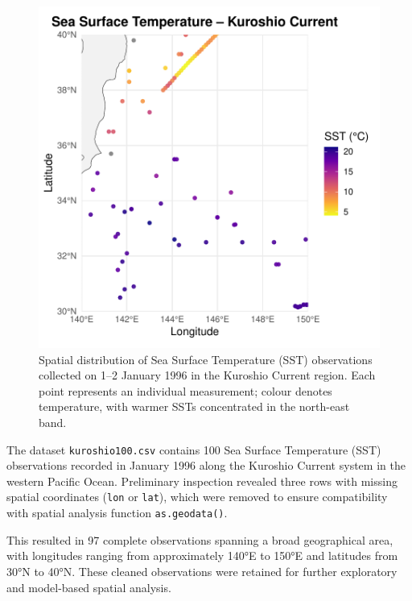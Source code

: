\documentclass[
  11pt,
]{article}
\begin{document}
\begin{figure}[H]

{\centering \includegraphics{project_files/figure-pdf/fig-scatterplot-1.pdf}

}

\caption{Spatial distribution of Sea Surface Temperature (SST)
observations collected on 1--2 January 1996 in the Kuroshio Current
region. Each point represents an individual measurement; colour denotes
temperature, with warmer SSTs concentrated in the north-east band.}

\end{figure}%

The dataset \texttt{kuroshio100.csv} contains 100 Sea Surface
Temperature (SST) observations recorded in January 1996 along the
Kuroshio Current system in the western Pacific Ocean. Preliminary
inspection revealed three rows with missing spatial coordinates
(\texttt{lon} or \texttt{lat}), which were removed to ensure
compatibility with spatial analysis function \texttt{as.geodata()}.

This resulted in 97 complete observations spanning a broad geographical
area, with longitudes ranging from approximately 140°E to 150°E and
latitudes from 30°N to 40°N. These cleaned observations were retained
for further exploratory and model-based spatial analysis.
\end{document}

